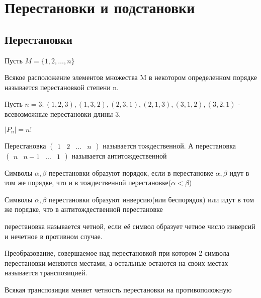 \section{Перестановки и подстановки}

\subsection{Перестановки}
Пусть \(M = \{1, 2, \ldots, n\}\)
\begin{definition}
	Всякое расположение элементов множества M в некотором определенном порядке называется перестановкой степени n. 
	
	Пусть \(n = 3: (1, 2, 3), (1, 3, 2), (2, 3, 1), (2, 1, 3), (3, 1, 2), (3, 2, 1)\) - всевозможные перестановки длины 3.
\end{definition}
\begin{note}
	\(|P_n| = n!\) 
\end{note}
\begin{definition}
	Перестановка \(\begin{pmatrix}
		1 & 2 & \ldots & n
	\end{pmatrix} \) называется тождественной. А перестановка \(\begin{pmatrix}
	n & n-1 & \ldots & 1
	\end{pmatrix} \) называется антитождественной
\end{definition}
\begin{definition}
	Символы $\alpha, \beta$ перестановки образуют порядок, если в перестановке \(\alpha, \beta\) идут в том же порядке, что и в тождественной перестановке($\alpha<\beta$)
\end{definition}
\begin{definition}
	Символы $\alpha, \beta$ перестановки образуют инверсию(или беспорядок) или идут в том же порядке, что в антитождественной перестановке
\end{definition}
\begin{definition}
	перестановка называется четной, если её символ образует четное число инверсий и нечетное в противном случае.
\end{definition}
\begin{definition}
	Преобразование, совершаемое над перестановкой при котором 2 символа перестановки меняются местами, а остальные остаются на своих местах называется транспозицией.
\end{definition}
\begin{proposition}
	Всякая транспозиция меняет четность перестановки на противоположную
\end{proposition}
